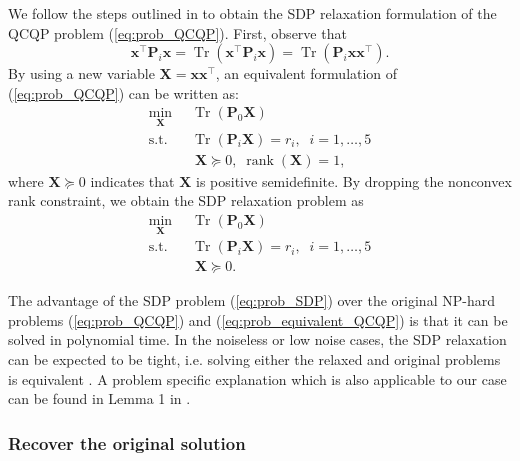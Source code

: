 \documentclass[journal]{IEEEtran}
\begin{document}
We follow the steps outlined in \cite{luo2010sdp} to obtain the SDP relaxation formulation of the QCQP problem (\ref{eq:prob_QCQP}). First, observe that 
\begin{equation}
    \mathbf{x}^\top \mathbf{P}_i \mathbf{x} = \operatorname{Tr}( \mathbf{x}^\top \mathbf{P}_i \mathbf{x}) = \operatorname{Tr}( \mathbf{P}_i \mathbf{x} \mathbf{x}^\top).
\end{equation}
By using a new variable $\mathbf{X} = \mathbf{x} \mathbf{x}^\top$, an equivalent formulation of (\ref{eq:prob_QCQP}) can be written as:
\begin{equation}\label{eq:prob_equivalent_QCQP}
\begin{aligned}
    \min\limits_{\mathbf{X}} \;\; &\operatorname{Tr}( \mathbf{P}_0 \mathbf{X})\\
    \textrm{s.t.} \;\;
    &\operatorname{Tr}( \mathbf{P}_i \mathbf{X} ) = r_i,\;\;i=1,\dots,5\\
    &\; \mathbf{X} \succeq 0,\;\operatorname{rank} (\mathbf{X}) = 1,
\end{aligned}
\end{equation}
where $\mathbf{X} \succeq 0$ indicates that $\mathbf{X}$ is positive semidefinite. By dropping the nonconvex rank constraint, we obtain the SDP relaxation problem as
\begin{equation}\label{eq:prob_SDP}
\begin{aligned}
    \min\limits_{\mathbf{X}} \;\; &\operatorname{Tr}( \mathbf{P}_0 \mathbf{X})\\
    \textrm{s.t.} \;\;
    &\operatorname{Tr}( \mathbf{P}_i \mathbf{X} ) = r_i,\;\;i=1,\dots,5\\
    &\; \mathbf{X} \succeq 0.
\end{aligned}
\end{equation}

The advantage of the SDP problem (\ref{eq:prob_SDP}) over the original NP-hard problems (\ref{eq:prob_QCQP}) and (\ref{eq:prob_equivalent_QCQP}) is that it can be solved in polynomial time. 
In the noiseless or low noise cases, the SDP relaxation can be expected to be tight, i.e. solving either the relaxed and original problems is equivalent \cite{luo2010sdp}. A problem specific explanation which is also applicable to our case can be found in Lemma 1 in \cite{li2020relSDP}.

\subsubsection{Recover the original solution}
\end{document}
